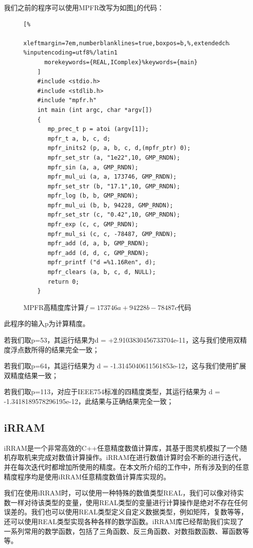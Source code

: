 我们之前的程序可以使用MPFR改写为如图\ref{lst:arbiexmpfrcode}的代码：

\begin{figure}[thbp]
    \begin{lstlisting}[%
      xleftmargin=7em,numberblanklines=true,boxpos=b,%,extendedchars=\true, %inputencoding=utf8%/latin1
      morekeywords={REAL,IComplex}%keywords={main}
    ]
    #include <stdio.h>
    #include <stdlib.h>
    #include "mpfr.h"
    int main (int argc, char *argv[])
    {
       mp_prec_t p = atoi (argv[1]);
       mpfr_t a, b, c, d;
       mpfr_inits2 (p, a, b, c, d,(mpfr_ptr) 0);
       mpfr_set_str (a, "1e22",10, GMP_RNDN);
       mpfr_sin (a, a, GMP_RNDN);
       mpfr_mul_ui (a, a, 173746, GMP_RNDN);
       mpfr_set_str (b, "17.1",10, GMP_RNDN);
       mpfr_log (b, b, GMP_RNDN);
       mpfr_mul_ui (b, b, 94228, GMP_RNDN);
       mpfr_set_str (c, "0.42",10, GMP_RNDN);
       mpfr_exp (c, c, GMP_RNDN);
       mpfr_mul_si (c, c, -78487, GMP_RNDN);
       mpfr_add (d, a, b, GMP_RNDN);
       mpfr_add (d, d, c, GMP_RNDN);
       mpfr_printf ("d =%1.16Ren", d);
       mpfr_clears (a, b, c, d, NULL);
       return 0;
    }
    \end{lstlisting}
    \caption{MPFR高精度库计算$f = 173746a + 94228b - 78487c$代码}
    \label{lst:arbiexmpfrcode}
\end{figure}

此程序的输入p为计算精度。

若我们取p=53，其运行结果为d = +2.9103830456733704e-11，这与我们使用双精度浮点数所得的结果完全一致；

若我们取p=64，其运行结果为 d = -1.3145040611561853e-12，这与我们使用扩展双精度结果一致；

若我们取p=113，对应于IEEE754标准的四精度类型，其运行结果为 d = -1.3418189578296195e-12，此结果与正确结果完全一致；

\subsection{iRRAM}

iRRAM是一个非常高效的C++任意精度数值计算库，其基于图灵机模拟了一个随机存取机来完成对数值计算操作。iRRAM在进行数值计算时会不断的进行迭代，并在每次迭代时都增加所使用的精度。在本文所介绍的工作中，所有涉及到的任意精度程序均是使用iRRAM任意精度数值计算库实现的。

我们在使用iRRAM时，可以使用一种特殊的数值类型REAL，我们可以像对待实数一样对待该类型的变量，使用REAL类型的变量进行计算操作是绝对不存在任何误差的。我们也可以使用REAL类型定义自定义数据类型，例如矩阵，复数等等，还可以使用REAL类型实现各种各样的数学函数。iRRAM库已经帮助我们实现了一系列常用的数学函数，包括了三角函数、反三角函数、对数指数函数、幂函数等等。

